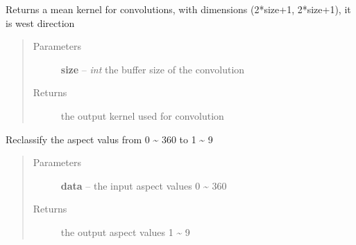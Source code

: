 \documentclass[letterpaper,10pt,english]{sphinxmanual}
\begin{document}

\begin{fulllineitems}
\label{docs/shielding:shield_mult.kern_w}
Returns a mean kernel for convolutions, with dimensions
(2*size+1, 2*size+1), it is west direction
\begin{quote}\begin{description}
\item[{Parameters}] \leavevmode
\textbf{size} -- \emph{int} the buffer size of the convolution

\item[{Returns}] \leavevmode
{} the output kernel used for convolution

\end{description}\end{quote}

\end{fulllineitems}



\begin{fulllineitems}
\label{docs/shielding:shield_mult.reclassify_aspect}
Reclassify the aspect valus from 0 \textasciitilde{} 360 to 1 \textasciitilde{} 9
\begin{quote}\begin{description}
\item[{Parameters}] \leavevmode
\textbf{data} --  the input aspect values 0 \textasciitilde{} 360

\item[{Returns}] \leavevmode
{} the output aspect values 1 \textasciitilde{} 9

\end{description}\end{quote}

\end{fulllineitems}


\end{document}

